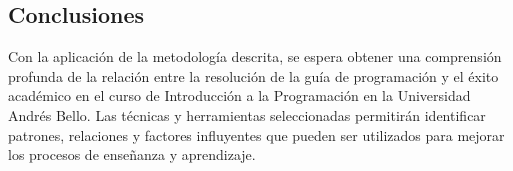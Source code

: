 \subsection{Conclusiones}

Con la aplicación de la metodología descrita, se espera obtener una comprensión profunda de la relación entre la resolución de la guía de programación y el éxito académico en el curso de Introducción a la Programación en la Universidad Andrés Bello. Las técnicas y herramientas seleccionadas permitirán identificar patrones, relaciones y factores influyentes que pueden ser utilizados para mejorar los procesos de enseñanza y aprendizaje.